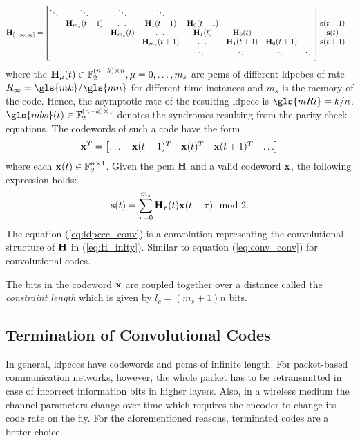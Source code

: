 \begin{align}\label{eq:H_infty}
\mathbf{H}_{[-\infty,\infty]} =& 
\begin{bmatrix}
  \ddots &\ddots &\ddots &\ddots\\
  &\mathbf{H}_{m_s}(t-1) &\dots &\mathbf{H}_1(t-1) &\mathbf{H}_0(t-1)\\
  & &\mathbf{H}_{m_s}(t) &\dots &\mathbf{H}_1(t) &\mathbf{H}_0(t)\\
  & & &\mathbf{H}_{m_s}(t+1) &\dots &\mathbf{H}_1(t+1) &\mathbf{H}_0(t+1)\\
  & & & &\ddots &\ddots &\ddots &\ddots
  \end{bmatrix}
  \begin{matrix}
  \mathbf{s}(t-1)\\
  \mathbf{s}(t)\\
  \mathbf{s}(t+1)\\
  \end{matrix}
\end{align}
where the $\mathbf{H}_\mu(t)\in\mathbb{F}_2^{(n-k)\times n},\mu=0,\dots,m_s$ are \glspl{pcm} of different \glspl{ldpcbc} of rate $R_\infty=\gls{mk}/\gls{mn}$ for different time instances and $m_s$ is the memory of the code. Hence, the asymptotic rate of the resulting \gls{ldpccc} is $\gls{mRi}=k/n$. $\gls{mbs}(t)\in\mathbb{F}_2^{(n-k)\times 1}$ denotes the syndromes resulting from the parity check equations. The codewords of such a code have the form 
\begin{align}
\mathbf{x}^T=
\begin{bmatrix}
\dots &\mathbf{x}(t-1)^T &\mathbf{x}(t)^T &\mathbf{x}(t+1)^T &\dots
\end{bmatrix}
\end{align}
where each $\mathbf{x}(t)\in\mathbb{F}_2^{n\times 1}$. Given the \gls{pcm} $\mathbf{H}$ and a valid codeword $\mathbf{x}$, the following expression holds:
\begin{align}\label{eq:ldpccc_conv}
\mathbf{s}(t)=\sum_{\tau=0}^{m_s}\mathbf{H}_\tau(t)\mathbf{x}(t-\tau)\mod 2.
\end{align}
The equation (\ref{eq:ldpccc_conv}) is a convolution representing the convolutional structure of $\mathbf{H}$ in (\ref{eq:H_infty}). Similar to equation (\ref{eq:conv_conv}) for convolutional codes.

The bits in the codeword $\mathbf{x}$ are coupled together over a distance called the \emph{constraint length} which is given by $l_c=(m_s+1)n$ bits.

\subsection{Termination of Convolutional Codes}
In general, \glspl{ldpccc} have codewords and \glspl{pcm} of infinite length. For packet-based communication networks, however, the whole packet has to be retransmitted in case of incorrect information bits in higher layers. Also, in a wireless medium the channel parameters change over time which requires the encoder to change its code rate on the fly. For the aforementioned reasons, terminated codes are a better choice.


